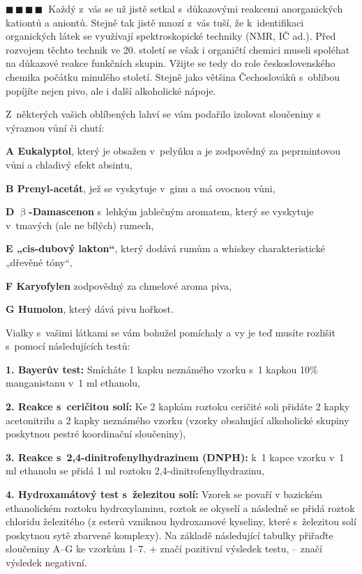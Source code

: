 \documentclass{book}
\newcommand{\ctyri}{$\blacksquare \, \blacksquare \, \blacksquare \, \blacksquare \; \; $}
\renewenvironment{quotation}{\par}{\par} %
\begin{document}
\hrulefill %
\begin{quotation}
\ctyri Každý z~vás se už jistě setkal s~důkazovými reakcemi anorganických
kationtů a aniontů. Stejně tak jistě mnozí z~vás tuší, že k~identifikaci
organických látek se využívají spektroskopické techniky (NMR, IČ ad.).
Před rozvojem těchto technik ve 20. století se však i organičtí chemici
museli spoléhat na důkazové reakce funkčních skupin. Vžijte se tedy
do role československého chemika počátku minulého století. Stejně
jako většina Čechoslováků s~oblibou popíjíte nejen pivo, ale i další
alkoholické nápoje.

Z~některých vašich oblíbených lahví se vám podařilo izolovat sloučeniny
s výraznou vůní či chutí: 

\textbf{A Eukalyptol}, který je obsažen v~pelyňku a je zodpovědný
za peprmintovou vůni a chladivý efekt absintu,

\textbf{B Prenyl-acetát}, jež se vyskytuje v~ginu a má ovocnou vůni,\textbf{ }

\textbf{D $\upbeta$-Damascenon} s~lehkým jablečným aromatem, který
se vyskytuje v~tmavých (ale ne bílých) rumech, 

\textbf{E „cis-dubový lakton“}, který dodává rumům a whiskey charakteristické
„dřevěné tóny“, 

\textbf{F Karyofylen} zodpovědný za chmelové aroma piva,

\textbf{G Humolon}, který dává pivu hořkost. 

Vialky s~vašimi látkami se vám bohužel pomíchaly a vy je teď musíte
rozlišit s~pomocí následujících testů:

\textbf{1. Bayerův test:} Smícháte 1 kapku neznámého vzorku s~1 kapkou
10\% manganistanu v~1 ml ethanolu,

\textbf{2. Reakce s~ceričitou solí: }Ke 2 kapkám roztoku ceričité
soli přidáte 2 kapky acetonitrilu a 2 kapky neznámého vzorku (vzorky
obsahující alkoholické skupiny poskytnou pestré koordinační sloučeniny),

\textbf{3. Reakce s~2,4-dinitrofenylhydrazinem (DNPH):} k~1 kapce
vzor\-ku v~1 ml ethanolu se přidá 1 ml roztoku 2,4-dinitrofenylhydrazinu, 

\textbf{4. Hydroxamátový test s~železitou solí:} Vzorek se povaří
v bazickém ethanolickém roztoku hydroxylaminu, roztok se okyselí a
následně se přidá roztok chloridu železitého (z esterů vzniknou hydroxamové
kyseliny, které s~železitou solí poskytnou sytě zbarvené komplexy).
Na základě následující tabulky přiřaďte sloučeniny A--G ke vzorkům
1--7. + značí pozitivní výsledek testu, -- značí výsledek negativní.
\begin{center}
\begin{tabular}{c|c|c|c|c|c|c}


\end{tabular}
\end{center}
\end{quotation}
\end{document}
